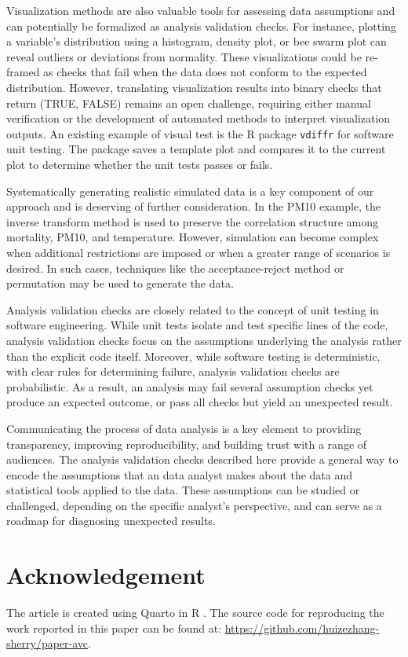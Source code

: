 \documentclass[
  12pt,
]{interact}
\begin{document}
Visualization methods are also valuable tools for assessing data
assumptions and can potentially be formalized as analysis validation
checks. For instance, plotting a variable's distribution using a
histogram, density plot, or bee swarm plot can reveal outliers or
deviations from normality. These visualizations could be re-framed as
checks that fail when the data does not conform to the expected
distribution. However, translating visualization results into binary
checks that return (TRUE, FALSE) remains an open challenge, requiring
either manual verification or the development of automated methods to
interpret visualization outputs. An existing example of visual test is
the R package \texttt{vdiffr} \citep{vdiffr} for software unit testing.
The package saves a template plot and compares it to the current plot to
determine whether the unit tests passes or fails.

Systematically generating realistic simulated data is a key component of
our approach and is deserving of further consideration. In the PM10
example, the inverse transform method is used to preserve the
correlation structure among mortality, PM10, and temperature. However,
simulation can become complex when additional restrictions are imposed
or when a greater range of scenarios is desired. In such cases,
techniques like the acceptance-reject method or permutation may be used
to generate the data.

Analysis validation checks are closely related to the concept of unit
testing in software engineering. While unit tests isolate and test
specific lines of the code, analysis validation checks focus on the
assumptions underlying the analysis rather than the explicit code
itself. Moreover, while software testing is deterministic, with clear
rules for determining failure, analysis validation checks are
probabilistic. As a result, an analysis may fail several assumption
checks yet produce an expected outcome, or pass all checks but yield an
unexpected result.

Communicating the process of data analysis is a key element to providing
transparency, improving reproducibility, and building trust with a range
of audiences. The analysis validation checks described here provide a
general way to encode the assumptions that an data analyst makes about
the data and statistical tools applied to the data. These assumptions
can be studied or challenged, depending on the specific analyst's
perspective, and can serve as a roadmap for diagnosing unexpected
results.

\section{Acknowledgement}\label{acknowledgement}

The article is created using Quarto \citep{Allaire_Quarto_2022} in R
\citep{R}. The source code for reproducing the work reported in this
paper can be found at:
\url{https://github.com/huizezhang-sherry/paper-avc}.


\renewcommand\refname{References}
  
\end{document}
